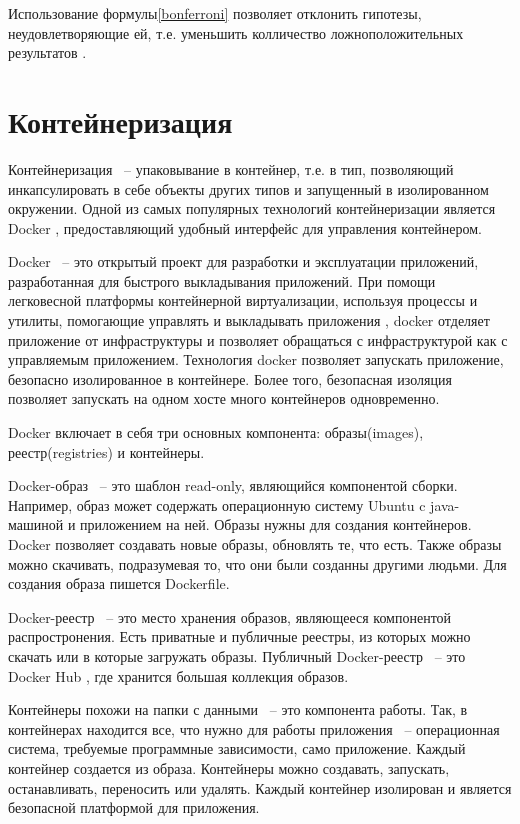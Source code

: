 \documentclass[times,specification,annotation]{itmo-student-thesis}
\begin{document}
Использование формулы\ref{bonferroni} позволяет отклонить гипотезы, неудовлетворяющие ей, т.е. уменьшить колличество ложноположительных результатов \cite{Bonferroni}.

\section{Контейнеризация}

Контейнеризация ~-- упаковывание в контейнер, т.е. в тип, позволяющий инкапсулировать в себе объекты других типов \cite{Containerization} и запущенный в изолированном окружении. Одной из самых популярных технологий контейнеризации является Docker \cite{Docker}, предоставляющий удобный интерфейс для управления контейнером. 

Docker ~-- это открытый проект для разработки и эксплуатации приложений, разработанная для быстрого выкладывания приложений. При помощи легковесной платформы контейнерной виртуализации, используя процессы и утилиты, помогающие управлять и выкладывать приложения \cite{DockerUnderstanding}, docker отделяет приложение от инфраструктуры и позволяет обращаться с инфраструктурой как с управляемым приложением. Технология docker позволяет запускать приложение, безопасно изолированное в контейнере. Более того, безопасная изоляция позволяет запускать на одном хосте много контейнеров одновременно. 

Docker включает в себя три основных компонента: образы(images), реестр(registries) и контейнеры.

Docker-образ ~-- это шаблон read-only, являющийся компонентой сборки. Например, образ может содержать операционную систему Ubuntu c java-машиной и приложением на ней. Образы нужны для создания контейнеров. Docker позволяет создавать новые образы, обновлять те, что есть. Также образы можно скачивать, подразумевая то, что они были созданны другими людьми. Для создания образа пишется Dockerfile.

Docker-реестр ~-- это место хранения образов, являющееся компонентой распростронения. Есть приватные и публичные реестры, из которых можно скачать или в которые загружать образы. Публичный Docker-реестр ~-- это Docker Hub \cite{DockerHub}, где хранится большая коллекция образов.

Контейнеры похожи на папки с данными ~-- это компонента работы. Так, в контейнерах находится все, что нужно для работы приложения ~-- операционная система, требуемые программные зависимости, само приложение. Каждый контейнер создается из образа. Контейнеры можно создавать, запускать, останавливать, переносить или удалять. Каждый контейнер изолирован и является безопасной платформой для приложения.
\end{document}
